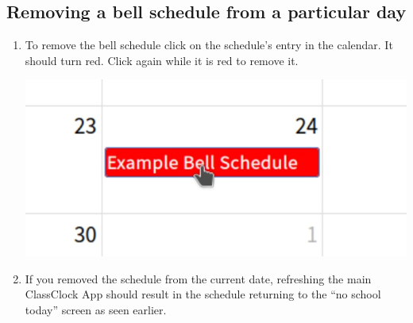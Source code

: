 \documentclass{article}
\begin{document}
\subsection{Removing a bell schedule from a particular day}
\begin{enumerate}
\item {To remove the bell schedule click on the schedule's entry in the calendar. It should turn red.
Click again while it is red to remove it.}
\begin{center}
\includegraphics[width=\textwidth]{Mini20Manual-img017.png}
\end{center}
\item {If you removed the schedule from the current date, refreshing the main ClassClock App should result in the schedule
returning to the “no school today” screen as seen earlier.}
\end{enumerate}
\end{document}
